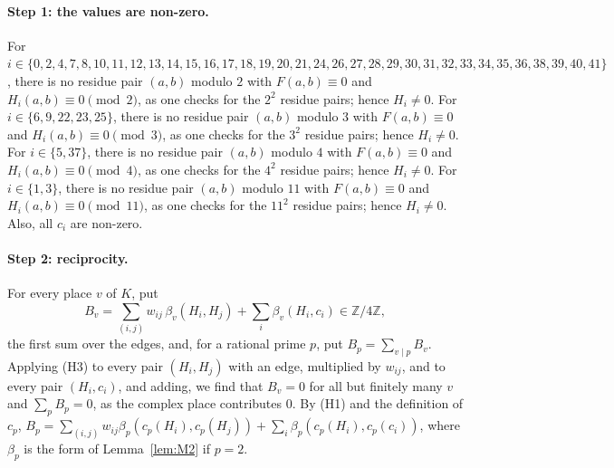 \documentclass[11pt]{article}
\newcommand{\Z}{\mathbb{Z}}
\begin{document}
\paragraph{Step 1: the values are non-zero.} For $i\in\{0,\allowbreak 2,\allowbreak 4,\allowbreak 7,\allowbreak 8,\allowbreak 10,\allowbreak 11,\allowbreak 12,\allowbreak 13,\allowbreak 14,\allowbreak 15,\allowbreak 16,\allowbreak 17,\allowbreak 18,\allowbreak 19,\allowbreak 20,\allowbreak 21,\allowbreak 24,\allowbreak 26,\allowbreak 27,\allowbreak 28,\allowbreak 29,\allowbreak 30,\allowbreak 31,\allowbreak 32,\allowbreak 33,\allowbreak 34,\allowbreak 35,\allowbreak 36,\allowbreak 38,\allowbreak 39,\allowbreak 40,\allowbreak 41\}$, there is no residue pair $(a,b)$ modulo $2$ with $F(a,b)\equiv0$ and $H_i(a,b)\equiv0\pmod{2}$, as one checks for the $2^2$ residue pairs; hence $H_i\neq0$. For $i\in\{6,\allowbreak 9,\allowbreak 22,\allowbreak 23,\allowbreak 25\}$, there is no residue pair $(a,b)$ modulo $3$ with $F(a,b)\equiv0$ and $H_i(a,b)\equiv0\pmod{3}$, as one checks for the $3^2$ residue pairs; hence $H_i\neq0$. For $i\in\{5,\allowbreak 37\}$, there is no residue pair $(a,b)$ modulo $4$ with $F(a,b)\equiv0$ and $H_i(a,b)\equiv0\pmod{4}$, as one checks for the $4^2$ residue pairs; hence $H_i\neq0$. For $i\in\{1,\allowbreak 3\}$, there is no residue pair $(a,b)$ modulo $11$ with $F(a,b)\equiv0$ and $H_i(a,b)\equiv0\pmod{11}$, as one checks for the $11^2$ residue pairs; hence $H_i\neq0$. Also, all $c_i$ are non-zero.

\paragraph{Step 2: reciprocity.} For every place $v$ of $K$, put
\begin{equation}\label{eq:B}
B_v=\sum_{(i,j)}w_{ij}\,\beta_v(H_i,H_j)+\sum_i\beta_v(H_i,c_i)\in\Z/4\Z,
\end{equation}
the first sum over the edges, and, for a rational prime $p$, put $B_p=\sum_{v\mid p}B_v$. Applying (H3) to every pair $(H_i,H_j)$ with an edge, multiplied by $w_{ij}$, and to every pair $(H_i,c_i)$, and adding, we find that $B_v=0$ for all but finitely many $v$ and $\sum_pB_p=0$, as the complex place contributes $0$. By (H1) and the definition of $c_p$, $B_p=\sum_{(i,j)}w_{ij}\beta_p(c_p(H_i),c_p(H_j))+\sum_i\beta_p(c_p(H_i),c_p(c_i))$, where $\beta_p$ is the form of Lemma~\ref{lem:M2} if $p=2$.
\end{document}
